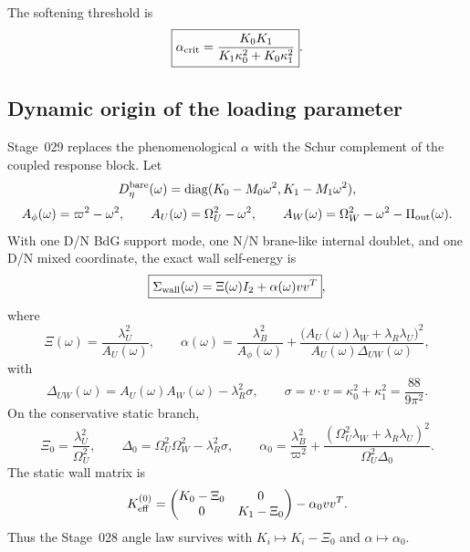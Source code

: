 The softening threshold is
\begin{equation}
\label{eq:part02-stage11-alpha-crit}
\boxed{
\alpha_{\rm crit}
=
\frac{K_0K_1}{K_1\kappa_0^2+K_0\kappa_1^2}}.
\end{equation}

\subsection{Dynamic origin of the loading parameter}
\label{subsec:part02-stage029-dynamic-loading}

Stage~029 replaces the phenomenological \(\alpha\) with the Schur complement of the coupled response block.  Let
\begin{equation}
D_\eta^{\rm bare}(\omega)
=
\operatorname{diag}(K_0-M_0\omega^2,K_1-M_1\omega^2),
\end{equation}
\begin{equation}
A_\phi(\omega)=\varpi^2-\omega^2,
\qquad
A_U(\omega)=\Omega_U^2-\omega^2,
\qquad
A_W(\omega)=\Omega_W^2-\omega^2-\Pi_{\rm out}(\omega).
\end{equation}
With one D/N BdG support mode, one N/N brane-like internal doublet, and one D/N mixed coordinate, the exact wall self-energy is
\begin{equation}
\label{eq:part02-stage12-schur-split}
\boxed{
\Sigma_{\rm wall}(\omega)=\Xi(\omega)I_2+\alpha(\omega)vv^T},
\end{equation}
where
\begin{equation}
\label{eq:part02-stage12-Xi-alpha}
\boxed{
\Xi(\omega)=\frac{\lambda_U^2}{A_U(\omega)},
\qquad
\alpha(\omega)=
\frac{\lambda_B^2}{A_\phi(\omega)}
+
\frac{\bigl(A_U(\omega)\lambda_W+\lambda_R\lambda_U\bigr)^2}
{A_U(\omega)\Delta_{UW}(\omega)}},
\end{equation}
with
\begin{equation}
\Delta_{UW}(\omega)=A_U(\omega)A_W(\omega)-\lambda_R^2\sigma,
\qquad
\sigma=v\cdot v=\kappa_0^2+\kappa_1^2=\frac{88}{9\pi^2}.
\end{equation}
On the conservative static branch,
\begin{equation}
\label{eq:part02-stage12-static-data}
\boxed{
\Xi_0=\frac{\lambda_U^2}{\Omega_U^2},
\qquad
\Delta_0=\Omega_U^2\Omega_W^2-\lambda_R^2\sigma,
\qquad
\alpha_0=\frac{\lambda_B^2}{\varpi^2}
+
\frac{(\Omega_U^2\lambda_W+\lambda_R\lambda_U)^2}{\Omega_U^2\Delta_0}}.
\end{equation}
The static wall matrix is
\begin{equation}
K_{\rm eff}^{(0)}
=
\begin{pmatrix}K_0-\Xi_0&0\\0&K_1-\Xi_0\end{pmatrix}
-
\alpha_0vv^T.
\end{equation}
Thus the Stage~028 angle law survives with \(K_i\mapsto K_i-\Xi_0\) and \(\alpha\mapsto\alpha_0\).

